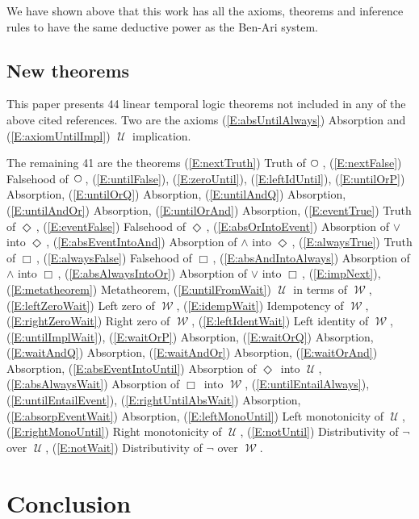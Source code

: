 \documentclass[12pt, fleqn, leqno]{article}
\newcommand{\Until}{\;\mathcal{U}\;}
\newcommand{\Wait}{\;\mathcal{W}\;}
\newcommand{\Next}{\;\,\text{\raisebox{3.5pt}{\circle{6}}}}
\newcommand{\Event}{\Diamond\,}
\newcommand{\Always}{\Box\,}
\begin{document}
We have shown above that this work has all the axioms, 
theorems and inference rules to have the same deductive power as the Ben-Ari system.\\

\subsection{New theorems}

This paper presents 44 linear temporal logic theorems not included in any of the above cited references.
Two are the axioms
(\ref{E:absUntilAlways}) Absorption and
(\ref{E:axiomUntilImpl}) $\Until$ implication.

The remaining 41 are the theorems
(\ref{E:nextTruth}) Truth of $\Next$,
(\ref{E:nextFalse}) Falsehood of $\Next$,
(\ref{E:untilFalse}),
(\ref{E:zeroUntil}),
(\ref{E:leftIdUntil}),
(\ref{E:untilOrP}) Absorption,
(\ref{E:untilOrQ}) Absorption,
(\ref{E:untilAndQ}) Absorption,
(\ref{E:untilAndOr}) Absorption,
(\ref{E:untilOrAnd}) Absorption,
(\ref{E:eventTrue}) Truth of $\Event$,
(\ref{E:eventFalse}) Falsehood of $\Event$,
(\ref{E:absOrIntoEvent}) Absorption of $\lor$ into $\Event$,
(\ref{E:absEventIntoAnd}) Absorption of $\land$ into $\Event$,
(\ref{E:alwaysTrue}) Truth of $\Always$,
(\ref{E:alwaysFalse}) Falsehood of $\Always$,
(\ref{E:absAndIntoAlways}) Absorption of $\land$ into $\Always$,
(\ref{E:absAlwaysIntoOr}) Absorption of $\lor$ into $\Always$,
(\ref{E:impNext}),
(\ref{E:metatheorem}) Metatheorem,
(\ref{E:untilFromWait}) $\Until$ in terms of $\Wait$,
(\ref{E:leftZeroWait}) Left zero of $\Wait$,
(\ref{E:idempWait}) Idempotency of $\Wait$,
(\ref{E:rightZeroWait}) Right zero of $\Wait$,
(\ref{E:leftIdentWait}) Left identity of $\Wait$,
(\ref{E:untilImplWait}),
(\ref{E:waitOrP}) Absorption,
(\ref{E:waitOrQ}) Absorption,
(\ref{E:waitAndQ}) Absorption,
(\ref{E:waitAndOr}) Absorption,
(\ref{E:waitOrAnd}) Absorption,
(\ref{E:absEventIntoUntil}) Absorption of $\Event$ into $\Until$,
(\ref{E:absAlwaysWait}) Absorption of $\Always$ into $\Wait$,
(\ref{E:untilEntailAlways}),
(\ref{E:untilEntailEvent}),
(\ref{E:rightUntilAbsWait}) Absorption,
(\ref{E:absorpEventWait}) Absorption,
(\ref{E:leftMonoUntil}) Left monotonicity of $\Until$,
(\ref{E:rightMonoUntil}) Right monotonicity of $\Until$,
(\ref{E:notUntil}) Distributivity of $\neg$ over $\Until$,
(\ref{E:notWait}) Distributivity of $\neg$ over $\Wait$.

\section{Conclusion}
\end{document}
